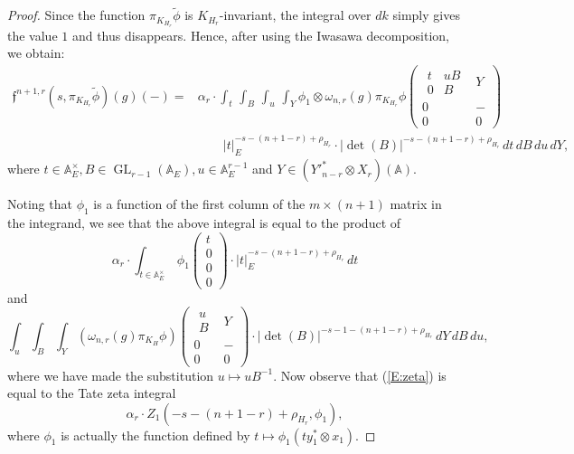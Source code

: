 \documentclass[10pt]{amsart}
\theoremstyle{plain}
\numberwithin{equation}{section}
\begin{document}
\begin{proof}
 Since the function $\pi_{K_{H_r}} \tilde{\phi}$ is
 $K_{H_r}$-invariant, the integral over $dk$ simply gives the value
 $1$ and thus disappears. 
 Hence, after using the Iwasawa decomposition, we obtain:
  \begin{align*}
  \mathfrak{f}^{n+1,r}(s, \pi_{K_{H_r}} \tilde{\phi})(g)(-) =&
  \alpha_r \cdot    \int_t \, \int_{B} \,   \int_{u} \,    \int_{Y}  
 \phi_1\otimes\omega_{n,r}(g) \pi_{K_{H_r}}{\phi}
\begin{pmatrix}
  \begin{smallmatrix}
  t & uB  \\
  0 & B \end{smallmatrix}  & Y \\   
  0 & - \\
  0 & 0  
\end{pmatrix}\\    
&\qquad
|t|_E^{-s -(n+1-r)  + \rho_{H_r}}\cdot |\det(B)|^{-s -(n+1-r) +
  \rho_{H_r}}\,    dt \,  dB\,  du \,  dY,
\end{align*}
where $t\in{\mathbb{A}}^\times_E, B\in{\operatorname{GL}}_{r-1}({\mathbb{A}}_E), u\in {\mathbb{A}}_E^{r-1}$ and $Y\in
({Y'}^*_{n-r}\otimes X_r)({\mathbb{A}})$.
  \vskip 5pt
             
 Noting that $\phi_1$ is a function of the
 first column of the $m \times (n+1)$ matrix in the integrand, we see
 that the above integral is equal to the product of
 \begin{equation} \label{E:zeta}   
\alpha_r \cdot  \int_{t\in {\mathbb{A}}_E^{\times}}  \,  \phi_1 
\begin{pmatrix}
 t \\
 0 \\
 0\\
 0
\end{pmatrix}
\cdot |t|_E^{-s -(n+1-r)+\rho_{H_r}} \,  dt
 \end{equation}
 and
 \begin{equation} \label{E:f}
 \int_u \int_B   \int_Y   (\omega_{n,r}(g) \pi_{K_H} \phi)
 \begin{pmatrix}
\begin{smallmatrix}
         u \\
         B 
\end{smallmatrix} & Y \\
         0 & - \\
         0 & 0
\end{pmatrix}
         \cdot  |\det (B)|^{-s -1 -(n+1-r)+ \rho_{H_r}}  \, dY \, dB \,
         du,   
\end{equation}
where we have made the substitution $u \mapsto uB^{-1}$. Now observe
that (\ref{E:zeta}) is equal to the Tate zeta integral 
\[  
\alpha_r \cdot Z_1(-s-(n+1-r) +\rho_{H_r}, \phi_1),
\]   
where $\phi_1$ is actually the function defined by $t\mapsto \phi_1(t y_1^*\otimes x_1)$.


\end{proof}
\end{document}
